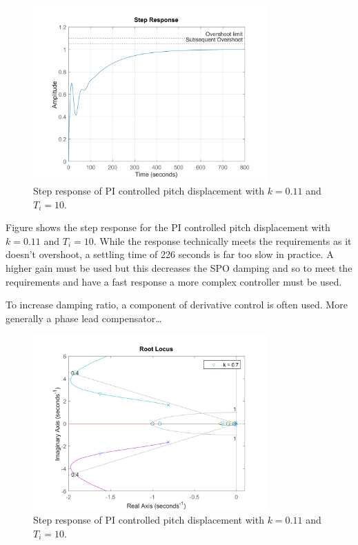 \documentclass{article}
\begin{document}
\begin{figure}[H]
    \centering
    \includegraphics[width=0.8\textwidth]{figures/pitch_autopilot_uncompensated_step.png}
    \caption{Step response of PI controlled pitch displacement with $k=0.11$ and $T_i = 10$.}
    \label{fig:pitch_autopilot_uncompensated_step}
\end{figure}

Figure shows the step response for the PI controlled pitch displacement with $k=0.11$ and $T_i = 10$.
While the response technically meets the requirements as it doesn't overshoot, a settling time of 226 seconds is far too slow in practice.
A higher gain must be used but this decreases the SPO damping and so to meet the requirements and have a fast response a more complex controller must be used.

To increase damping ratio, a component of derivative control is often used.
More generally a phase lead compensator\dots

\begin{figure}[H]
    \centering
    \includegraphics[width=0.8\textwidth]{figures/pitch_autopilot_locus_compensated.png}
    \caption{Step response of PI controlled pitch displacement with $k=0.11$ and $T_i = 10$.}
    \label{fig:pitch_autopilot_compensated_locus}
\end{figure}
\end{document}
